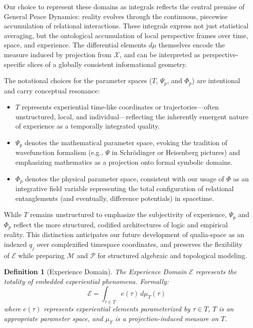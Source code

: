\documentclass{article}
\newtheorem{definition}{Definition}
\begin{document}
Our choice to represent these domains as integrals reflects the central premise of General Peace Dynamics: reality evolves through the continuous, piecewise accumulation of relational interactions. These integrals express not just statistical averaging, but the ontological accumulation of local perspective frames over time, space, and experience. The differential elements $d\mu$ themselves encode the measure induced by projection from $\mathcal{X}$, and can be interpreted as perspective-specific slices of a globally consistent informational geometry.

The notational choices for the parameter spaces ($T$, $\Psi_p$, and $\Phi_p$) are intentional and carry conceptual resonance:
\begin{itemize}
    \item $T$ represents experiential time-like coordinates or trajectories—often unstructured, local, and individual—reflecting the inherently emergent nature of experience as a temporally integrated quality.
    \item $\Psi_p$ denotes the mathematical parameter space, evoking the tradition of wavefunction formalism (e.g., $\Psi$ in Schr\"odinger or Heisenberg pictures) and emphasizing mathematics as a projection onto formal symbolic domains.
    \item $\Phi_p$ denotes the physical parameter space, consistent with our usage of $\Phi$ as an integrative field variable representing the total configuration of relational entanglements (and eventually, difference potentials) in spacetime.
\end{itemize}

While $T$ remains unstructured to emphasize the subjectivity of experience, $\Psi_p$ and $\Phi_p$ reflect the more structured, codified architectures of logic and empirical reality. This distinction anticipates our future development of qualia-space as an indexed $q_j$ over complexified timespace coordinates, and preserves the flexibility of $\mathcal{E}$ while preparing $\mathcal{M}$ and $\mathcal{P}$ for structured algebraic and topological modeling.

\begin{definition}[Experience Domain]
The Experience Domain $\mathcal{E}$ represents the totality of embedded experiential phenomena. Formally:
\begin{equation}
\mathcal{E} = \int_{\tau \in T} e(\tau) \, d\mu_T(\tau)
\end{equation}
where $e(\tau)$ represents experiential elements parameterized by $\tau \in T$, $T$ is an appropriate parameter space, and $\mu_T$ is a projection-induced measure on $T$.
\end{definition}
\end{document}
